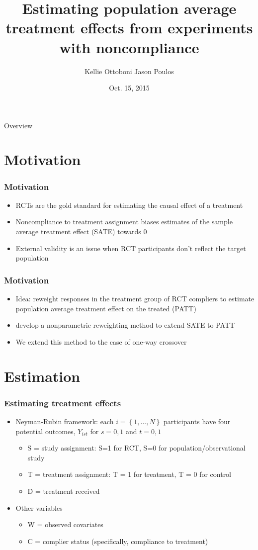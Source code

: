 \documentclass{beamer}
\title[]{Estimating population average treatment effects from experiments with noncompliance}
\author[K. Ottoboni, J. Poulos]{Kellie Ottoboni \hspace{10mm} Jason Poulos}
\date[10/15/15]{Oct. 15, 2015}
\begin{document}
\frame{\titlepage}

\begin{frame}{Overview}
\tableofcontents
\end{frame}


\section[Introduction]{Motivation}

\begin{frame}
\frametitle{Motivation}
\begin{itemize}
\item RCTs are the gold standard for estimating the causal effect of a treatment
\item Noncompliance to treatment assignment biases estimates of the sample average treatment effect (SATE) towards $0$
\item External validity is an issue when RCT participants don't reflect the target population
\end{itemize}
\end{frame}

\begin{frame}
\frametitle{Motivation}
\begin{itemize}
\item Idea: reweight responses in the treatment group of RCT compliers to estimate population average treatment effect on the treated (PATT)
\item \cite{Hartman} develop a nonparametric reweighting method to extend SATE to PATT
\item We extend this method to the case of one-way crossover
\end{itemize}
\end{frame}

\section[Estimation]{Estimation}

\begin{frame}
\frametitle{Estimating treatment effects}
\begin{itemize}
\item Neyman-Rubin framework: each $i = \left\{1, ..., N \right\}$ participants have four potential outcomes, $Y_{ist}$ for $s = 0,1$ and $t = 0,1$
\begin{itemize}
\item S = study assignment: S=1 for RCT, S=0 for population/observational study
\item T = treatment assignment: T = 1 for treatment, T = 0 for control
\item D = treatment received
\end{itemize}
\item Other variables
\begin{itemize}
\item W = observed covariates
\item C = complier status (specifically, compliance to treatment)
\end{itemize}
\end{itemize}
\end{frame}
\end{document}
